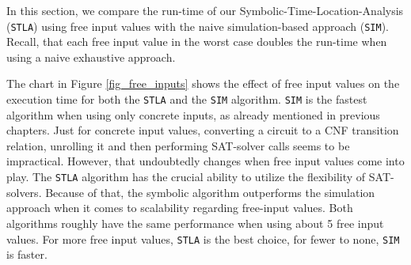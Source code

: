 \documentclass[a4paper,10pt]{article}
\begin{document}
In this section, we compare the run-time of our Symbolic-Time-Location-Analysis (\texttt{STLA}) using free input values with the naive simulation-based approach (\texttt{SIM}).
Recall, that each free input value in the worst case doubles the run-time when using a naive exhaustive approach.

The chart in Figure \ref{fig_free_inputs} shows the effect of free input values on the execution time for both the \texttt{STLA} and the \texttt{SIM} algorithm.
\texttt{SIM} is the fastest algorithm when using only concrete inputs, as already mentioned in previous chapters. Just for concrete input values, converting a circuit to a CNF transition relation, unrolling it and then
performing SAT-solver calls seems to be impractical. However, that undoubtedly changes when free input values come into play. The \texttt{STLA} algorithm has the crucial ability to utilize the flexibility of SAT-solvers.
Because of that, the symbolic algorithm outperforms the simulation approach when it comes to scalability regarding free-input values. Both algorithms roughly have the same performance when using about 5 free input values.
For more free input values, \texttt{STLA} is the best choice, for fewer to none, \texttt{SIM} is faster.
\end{document}
